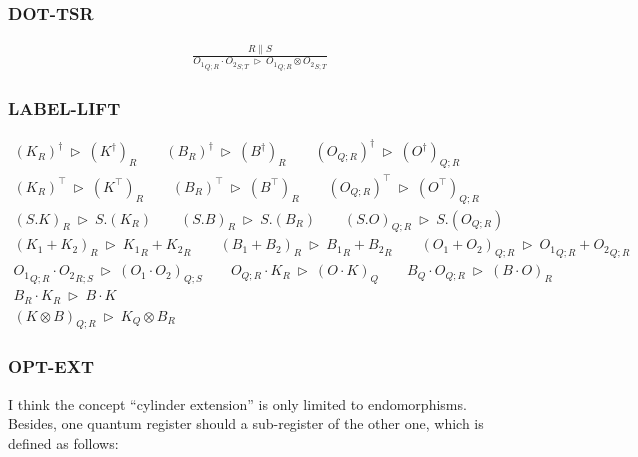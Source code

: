 \documentclass[manuscript, review, timestamp]{acmart}
\newcommand*{\reduce}{\ \triangleright\ }
\begin{document}
\subsubsection*{\textsf{DOT-TSR}}
\begin{align*}
  \frac{R \| S}{{O_1}_{Q; R} \cdot {O_2}_{S; T} \reduce {O_1}_{Q; R} \otimes {O_2}_{S; T}}
\end{align*}

\subsubsection*{\textsf{LABEL-LIFT}}
\begin{gather*}
  (K_{R})^\dagger \reduce (K^\dagger)_{R}
  \qquad
  (B_{R})^\dagger \reduce (B^\dagger)_{R}
  \qquad
  (O_{Q; R})^\dagger \reduce (O^\dagger)_{Q; R} \\
  (K_{R})^\top \reduce (K^\top)_{R}
  \qquad
  (B_{R})^\top \reduce (B^\top)_{R}
  \qquad
  (O_{Q; R})^\top \reduce (O^\top)_{Q; R} \\
  (S.K)_{R} \reduce S.(K_{R})
  \qquad
  (S.B)_{R} \reduce S.(B_{R})
  \qquad
  (S.O)_{Q; R} \reduce S.(O_{Q; R}) \\
  (K_1 + K_2)_{R} \reduce {K_1}_{R} + {K_2}_{R}
  \qquad
  (B_1 + B_2)_{R} \reduce {B_1}_{R} + {B_2}_{R}
  \qquad
  (O_1 + O_2)_{Q; R} \reduce {O_1}_{Q; R} + {O_2}_{Q; R}
\end{gather*}
\begin{gather*}
  {O_1}_{Q; R} \cdot {O_2}_{R; S} \reduce (O_1 \cdot O_2)_{Q; S}
  \qquad
  O_{Q; R} \cdot K_{R} \reduce (O \cdot K)_{Q}
  \qquad
  B_{Q} \cdot O_{Q; R} \reduce (B \cdot O)_{R} \\
  B_{R} \cdot K_{R} \reduce B \cdot K \\
  (K \otimes B)_{Q; R} \reduce K_{Q} \otimes B_{R}
\end{gather*}

\subsubsection*{\textsf{OPT-EXT}}
I think the concept ``cylinder extension'' is only limited to endomorphisms. Besides, one quantum register should a sub-register of the other one, which is defined as follows:
\end{document}
